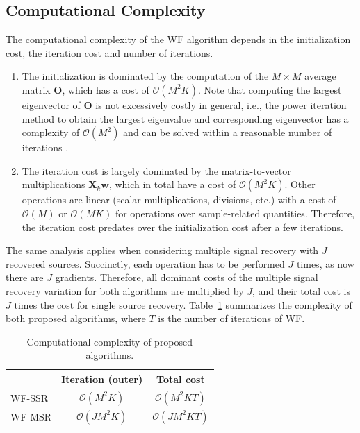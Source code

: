 \subsection{Computational Complexity}
The computational complexity of the WF algorithm depends in the initialization cost, the iteration cost and number of iterations. 
\begin{enumerate}
	\item The initialization is dominated by the computation of the $M\times M$ average matrix $\bm{O}$, which has a cost of $\mathcal{O}(M^2K)$. Note that computing the largest eigenvector of $\bm{O}$ is not excessively costly in general, i.e., the power iteration method to obtain the largest eigenvalue and corresponding eigenvector has a complexity of $\mathcal{O}(M^2)$ and can be solved within a reasonable number of iterations \cite{Candes2015a_phaseretrievalWF}.
	\item The iteration cost is largely dominated by the matrix-to-vector multiplications $\bm{X}_k\bm{w}$, which in total have a cost of $\mathcal{O}(M^2K)$. Other operations are linear (scalar multiplications, divisions, etc.) with a cost of $\mathcal{O}(M)$ or $\mathcal{O}(MK)$ for operations over sample-related quantities. Therefore, the iteration cost predates over the initialization cost after a few iterations.
\end{enumerate}



The same analysis applies when considering multiple signal recovery with $J$ recovered sources. Succinctly, each operation has to be performed $J$ times, as now there are $J$ gradients. Therefore, all dominant costs of the multiple signal recovery variation for both algorithms are multiplied by $J$, and their total cost is $J$ times the cost for single source recovery. Table~\ref{table:complexity_wf} summarizes the complexity of both proposed algorithms, where $T$ is the number of iterations of WF.
\begin{table}
	\caption{Computational complexity of proposed algorithms.}\label{table:complexity_wf}
	\centering
	\begin{tabular}{l|cc}
		& Iteration (outer) & Total cost\\\hline
		WF-SSR&  $\mathcal{O}(M^2K)$  & $\mathcal{O}(M^2KT)$  \\
		WF-MSR&  $\mathcal{O}(JM^2K)$  & $\mathcal{O}(JM^2KT)$  \\
	\end{tabular}
\end{table}


